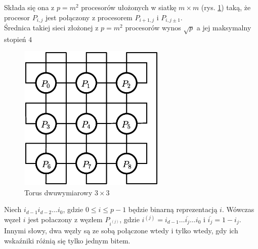\begin{przyklad}
Składa się ona z \(p=m^2\) procesorów ułożonych w siatkę \(m\times m\) (rys. \ref{fig:model_torus2d}) taką, że procesor \(P_{i,j}\) jest połączony z procesorem \(P_{i+1, j}\) i \(P_{i, j\pm 1}\).\\
Średnica takiej sieci złożonej z \(p=m^2\) procesorów wynos \(\sqrt{p}\) a jej maksymalny stopień \(4\)
\begin{figure}[h]
\centering
\includegraphics[width=7cm]{images/torus2d}
\caption{Torus dwuwymiarowy \(3\times3\)}
\label{fig:model_torus2d}
\end{figure}
\end{przyklad}


\begin{definicja}
Niech \(i_{d-1}i_{d-2}\dots i_{0}\), gdzie \(0\leq i \leq p-1\) będzie binarną reprezentacją \(i\). Wówczas węzeł \({i}\) jest połaczony z węzłem \(P_{i^(j)}\), gdzie \(i^{(j)}=i_{d-1}\dots \overline{i_j} \dots i_0\) i \(\overline{i_j} = 1 - i_j\). Innymi słowy, dwa węzły są ze sobą połączone wtedy i tylko wtedy, gdy ich wskaźniki różnią się tylko jednym bitem.\\
\end{definicja}

